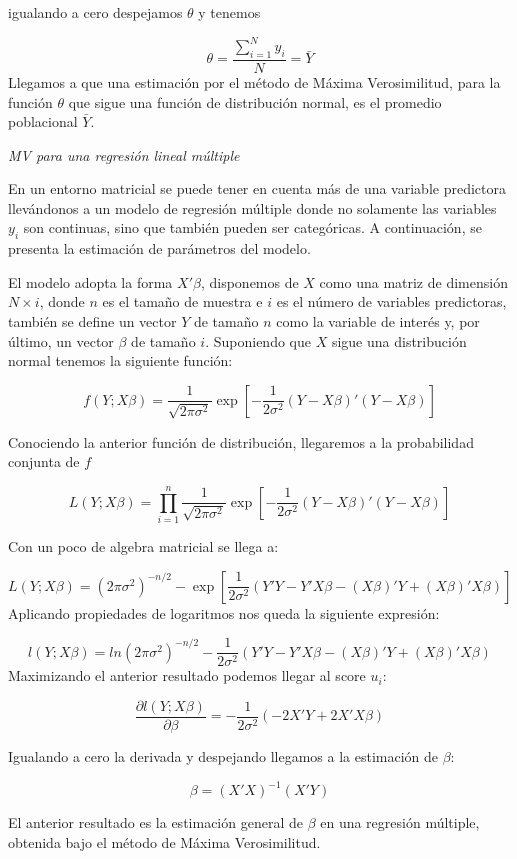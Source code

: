 \documentclass[
  spanish,
  12pt,
]{book}
\begin{document}
igualando a cero despejamos \(\theta\) y tenemos

\[
\theta=\dfrac{\sum_{i=1}^{N}y_{i}}{N}=\bar{Y}
\]
Llegamos a que una estimación por el método de Máxima Verosimilitud, para la función \(\theta\) que sigue una función de distribución normal, es el promedio poblacional \(\bar{Y}\).

\emph{MV para una regresión lineal múltiple}

En un entorno matricial se puede tener en cuenta más de una variable predictora llevándonos a un modelo de regresión múltiple donde no solamente las variables \(y_{i}\) son continuas, sino que también pueden ser categóricas. A continuación, se presenta la estimación de parámetros del modelo.

El modelo adopta la forma \(X'\beta\), disponemos de \(X\) como una matriz de dimensión \(N\times i\), donde \(n\) es el tamaño de muestra e \(i\) es el número de variables predictoras, también se define un vector \(Y\) de tamaño \(n\) como la variable de interés y, por último, un vector \(\beta\) de tamaño \(i\). Suponiendo que \(X\) sigue una distribución
normal tenemos la siguiente función:

\[
f(Y;X\beta)=\dfrac{1}{\sqrt{2\pi\sigma^{2}}}\exp\left[-\dfrac{1}{2\sigma^{2}}(Y-X\beta)'(Y-X\beta)\right]
\]

Conociendo la anterior función de distribución, llegaremos a la probabilidad conjunta de \(f\)

\[
L(Y;X\beta)=\prod_{i=1}^{n}\dfrac{1}{\sqrt{2\pi\sigma^{2}}}\exp\left[-\dfrac{1}{2\sigma^{2}}(Y-X\beta)'(Y-X\beta)\right]
\]

Con un poco de algebra matricial se llega a:

\[
L(Y;X\beta)=(2\pi\sigma^{2})^{-n/2}-\exp\left[\dfrac{1}{2\sigma^{2}}(Y'Y-Y'X\beta-(X\beta)'Y+(X\beta)'X\beta)\right]
\]
Aplicando propiedades de logaritmos nos queda la siguiente expresión:

\[
l(Y;X\beta)=ln(2\pi\sigma^{2})^{-n/2}-\dfrac{1}{2\sigma^{2}}(Y'Y-Y'X\beta-(X\beta)'Y+(X\beta)'X\beta)
\]
Maximizando el anterior resultado podemos llegar al score \(u_{i}\):

\[
\dfrac{\partial l(Y;X\beta)}{\partial\beta}=-\dfrac{1}{2\sigma^{2}}(-2X'Y+2X'X\beta)
\]

Igualando a cero la derivada y despejando llegamos a la estimación de \(\beta\):

\[
\beta=(X'X)^{-1}(X'Y)
\]

El anterior resultado es la estimación general de \(\beta\) en una regresión múltiple, obtenida bajo el método de Máxima Verosimilitud.
\end{document}
